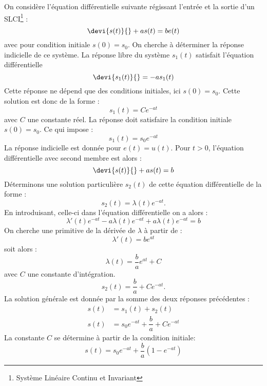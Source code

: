 On considère l'équation différentielle suivante régissant l'entrée
et la sortie d'un SLCI\footnote{Système Linéaire Continu et Invariant} :
$$
\devi{s(t)}{}+as(t)=be(t)
$$
avec pour condition initiale $s(0)=s_0$.
On cherche à déterminer la réponse indicielle de ce système.
La réponse libre du système $s_1(t)$ satisfait l'équation différentielle
$$
\devi{s_1(t)}{}=-as_1(t)
$$
Cette réponse ne dépend que des conditions initiales, ici $s(0)=s_0$.
Cette solution est donc de la forme :
$$
s_1(t)=Ce^{-at}
$$
avec $C$ une constante réel. La réponse doit satisfaire la condition 
initiale $s(0)=s_0$. Ce qui impose :
$$
s_1(t)=s_0e^{-at}
$$
La réponse indicielle est donnée pour $e(t)=u(t)$. Pour $t>0$, l'équation 
différentielle avec second membre est alors :
$$
\devi{s(t)}{}+as(t)=b
$$
Déterminons une solution particulière $s_2(t)$ de cette équation 
différentielle de la forme :
$$
s_2(t)=\lambda(t)e^{-at}.
$$
En introduisant, celle-ci dans l'équation différentielle on a alors :
$$
\lambda'(t)e^{-at}-a\lambda(t)e^{-at}+a\lambda(t)e^{-at}=b
$$
On cherche une primitive de la dérivée de $\lambda$ à partir de :
$$
\lambda'(t)=be^{at}
$$
soit alors :
$$
\lambda(t)=\dfrac{b}{a}e^{at}+C
$$
avec $C$ une constante d'intégration.
$$
s_2(t)=\dfrac{b}{a}+Ce^{-at}.
$$
La solution générale est donnée par la somme des deux réponses précédentes :
\begin{align*}
    s(t)&=s_1(t)+s_2(t)\\
    s(t)&=s_0e^{-at}+\dfrac{b}{a}+Ce^{-at}
\end{align*}
La constante $C$ se détermine à partir de la condition initiale:
$$
s(t)=s_0e^{-at}+\dfrac{b}{a}\left(1-e^{-at}\right)
$$
\begin{center}
{\tikzset{external/export=false}       
}
\end{center}
